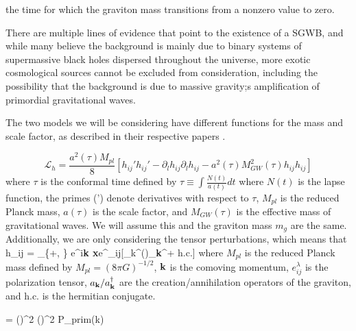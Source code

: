 the time for which the graviton mass transitions from a nonzero value to zero.

There are multiple lines of evidence that point to the existence of a SGWB, and while many believe the background is mainly due to binary systems of supermassive black holes dispersed throughout the universe, more exotic cosmological sources cannot be excluded from consideration\cite{Agazie:2023}, including the possibility that the background is due to massive gravity;s amplification of primordial gravitational waves. 


The two models we will be considering have different functions for the mass and scale factor, as described in their respective papers \cite{Gumrukcuoglu:2012, Fujita:2018}. 

\begin{equation}\label{eqn:1}
    \mathcal{L}_h = \frac{a^2(\tau)M_{pl}}{8}[h_{ij}' h_{ij}' - \partial_lh_{ij}\partial_l h_{ij} - a^2(\tau)M_{GW}^2(\tau)h_{ij}h_{ij}]
\end{equation}
where $\tau$ is the conformal time defined by $\tau \equiv \int \frac{N(t)}{a(t)}dt$ where $N(t)$ is the lapse function, the primes (') denote derivatives with respect to $\tau$, $M_{pl}$ is the reduced Planck mass, $a(\tau)$ is the scale factor, and $M_{GW}(\tau)$ is the effective mass of gravitational waves. We will assume this and the graviton mass $m_g$ are the same. Additionally, we are only considering the tensor perturbations, which means that 
h_{ij} = \sum_{\lambda \in \{+, \times\}} \int {}e^{i{\bf k \cdot x}}e^\lambda_{ij}[\gamma_k^\lambda(\tau)_{\bf k}^\lambda + \mbox{h.c.}] where $M_{pl}$ is the reduced Planck mass defined by $M_{pl} = (8\pi G)^{-1/2}$, ${\bf k}$ is the comoving momentum, $e^\lambda_{ij}$ is the polarization tensor, $a_{\bf k} / a_{\bf k}^\dagger$ are the creation/annihilation operators of the graviton, and h.c. is the hermitian conjugate. 


= \left(\right)^2 \left(\right)^2  P_{prim}(k) \\


